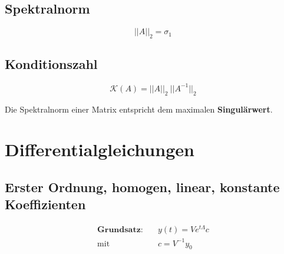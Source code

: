 \documentclass[11pt]{article}
\begin{document}
\subsection{Spektralnorm}

\begin{equation*}
	||A||_2 = \sigma_1
\end{equation*}

\subsection{Konditionszahl}

\begin{equation*}
	\mathcal{K}(A) = ||A||_2\ ||A^{-1}||_2
\end{equation*}

Die Spektralnorm einer Matrix entspricht dem maximalen \textbf{Singul{\"a}rwert}.

\section{Differentialgleichungen}

\subsection{Erster Ordnung, homogen, linear, konstante Koeffizienten}

\begin{equation*}
\begin{split}
	\textbf{Grundsatz:}\quad & y(t) = Ve^{t\Lambda}c \\
	\text{mit}\quad & c = V^{-1}y_0
\end{split}
\end{equation*}
\end{document}
